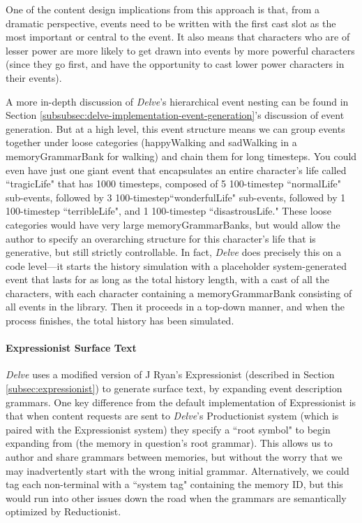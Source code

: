 One of the content design implications from this approach is that, from a dramatic perspective, events need to be written with the first cast slot as the most important or central to the event. It also means that characters who are of lesser power are more likely to get drawn into events by more powerful characters (since they go first, and have the opportunity to cast lower power characters in their events).

A more in-depth discussion of \textit{Delve}'s hierarchical event nesting can be found in Section \ref{subsubsec:delve-implementation-event-generation}'s discussion of event generation. But at a high level, this event structure means we can group events together under loose categories (happyWalking and sadWalking in a memoryGrammarBank for walking) and chain them for long timesteps. You could even have just one giant event that encapsulates an entire character's life called ``tragicLife" that has 1000 timesteps, composed of 5 100-timestep ``normalLife" sub-events, followed by 3 100-timestep``wonderfulLife" sub-events, followed by 1 100-timestep ``terribleLife", and 1 100-timestep ``disastrousLife." These loose categories would have very large memoryGrammarBanks, but would allow the author to specify an overarching structure for this character’s life that is generative, but still strictly controllable. In fact, \textit{Delve} does precisely this on a code level---it starts the history simulation with a placeholder system-generated event that lasts for as long as the total history length, with a cast of all the characters, with each character containing a memoryGrammarBank consisting of all events in the library. Then it proceeds in a top-down manner, and when the process finishes, the total history has been simulated.

\paragraph{Expressionist Surface Text}\label{par:expressionist-surface-text}

\textit{Delve} uses a modified version of J Ryan's Expressionist \cite{ryan2016expressionist} (described in Section \ref{subsec:expressionist}) to generate surface text, by expanding event description grammars. One key difference from the default implementation of Expressionist is that when content requests are sent to \textit{Delve}'s Productionist system (which is paired with the Expressionist system) they specify a ``root symbol" to begin expanding from (the memory in question's root grammar). This allows us to author and share grammars between memories, but without the worry that we may inadvertently start with the wrong initial grammar. Alternatively, we could tag each non-terminal with a ``system tag" containing the memory ID, but this would run into other issues down the road when the grammars are semantically optimized by Reductionist.

